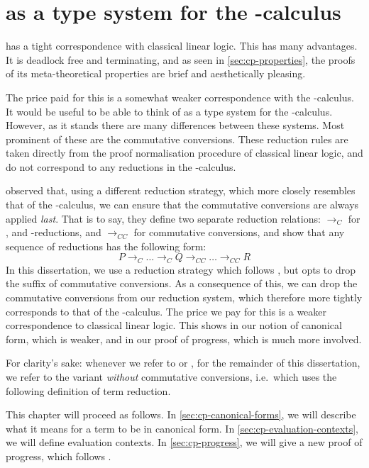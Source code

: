 \chapter{\cp as a type system for the \textpi-calculus}
\cp has a tight correspondence with classical linear logic.
This has many advantages.
It is deadlock free and terminating, and as seen in \cref{sec:cp-properties},
the proofs of its meta-theoretical properties are brief and aesthetically
pleasing.

The price paid for this is a somewhat weaker correspondence with the
\textpi-calculus.
It would be useful to be able to think of \cp as a type system for the
\textpi-calculus.
However, as it stands there are many differences between these systems.
Most prominent of these are the commutative conversions. These reduction rules
are taken directly from the proof normalisation procedure of classical linear
logic, and do not correspond to any reductions in the \textpi-calculus.

 observed that, using a different reduction
strategy, which more closely resembles that of the \textpi-calculus, we can
ensure that the commutative conversions are always applied \emph{last}.
That is to say, they define two separate reduction relations:
$\longrightarrow_{C}$ for ,  and \textbeta-reductions,
and $\longrightarrow_{CC}$ for commutative conversions, and show that any
sequence of reductions has the following form:
\[
  P \longrightarrow_{C} \dots \longrightarrow_{C} Q \longrightarrow_{CC} \dots \longrightarrow_{CC} R
\]
In this dissertation, we use a reduction strategy which follows
, but opts to drop the suffix of commutative
conversions.
As a consequence of this, we can drop the commutative conversions from our
reduction system, which therefore more tightly corresponds to that of the
\textpi-calculus. 
The price we pay for this is a weaker correspondence to classical linear logic.
This shows in our notion of canonical form, which is weaker, and in our proof of
progress, which is much more involved.

For clarity's sake: whenever we refer to \cp or \rcp, for the remainder of this
dissertation, we refer to the variant \emph{without} commutative conversions,
i.e.\ which uses the following definition of term reduction.


This chapter will proceed as follows.
In \cref{sec:cp-canonical-forms}, we will describe what it means for a term to
be in canonical form.
In \cref{sec:cp-evaluation-contexts}, we will define evaluation contexts.
In \cref{sec:cp-progress}, we will give a new proof of progress, which follows
.

